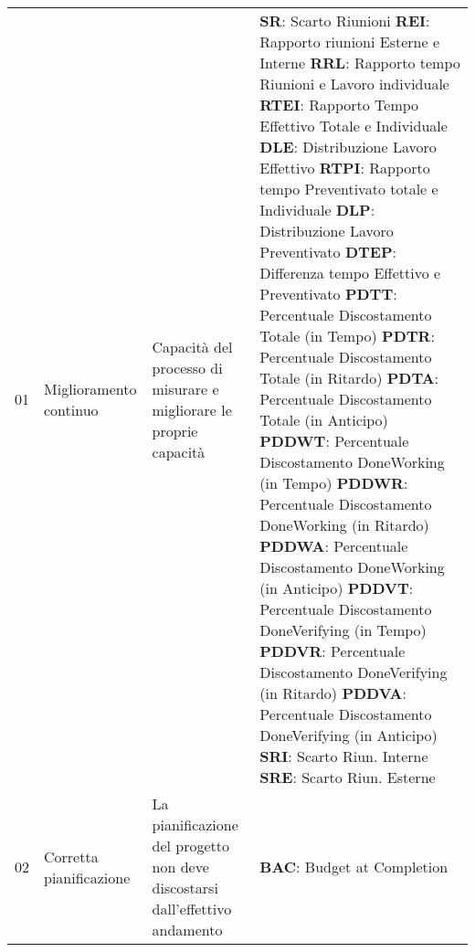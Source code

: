 \begin{longtable}{ 
		>{}p{} 
		>{}p{}
        >{}p{}
        >{\centering}p{} }
        01 & Miglioramento continuo & Capacità del processo di misurare e migliorare le proprie capacità & \textbf{SR}: Scarto Riunioni \newline
                         \textbf{REI}: Rapporto riunioni Esterne e Interne \newline
                        \textbf{RRL}: Rapporto tempo Riunioni e Lavoro individuale \newline
                        \textbf{RTEI}: Rapporto Tempo Effettivo Totale e Individuale \newline
                        \textbf{DLE}: Distribuzione Lavoro Effettivo \newline
                        \textbf{RTPI}: Rapporto tempo Preventivato totale e Individuale \newline
                         \textbf{DLP}: Distribuzione Lavoro Preventivato \newline 
                         \textbf{DTEP}: Differenza tempo Effettivo e Preventivato \newline 
                         \textbf{PDTT}: Percentuale Discostamento Totale (in Tempo) \newline 
                         \textbf{PDTR}: Percentuale Discostamento Totale (in Ritardo) \newline 
                         \textbf{PDTA}: Percentuale Discostamento Totale (in Anticipo) \newline 
                         \textbf{PDDWT}: Percentuale Discostamento DoneWorking (in Tempo) \newline 
                         \textbf{PDDWR}: Percentuale Discostamento DoneWorking (in Ritardo) \newline 
                         \textbf{PDDWA}: Percentuale Discostamento DoneWorking (in Anticipo) \newline 
                         \textbf{PDDVT}: Percentuale Discostamento DoneVerifying (in Tempo) \newline
                         \textbf{PDDVR}: Percentuale Discostamento DoneVerifying (in Ritardo) \newline
                         \textbf{PDDVA}: Percentuale Discostamento DoneVerifying (in Anticipo) \newline
                         \textbf{SRI}: Scarto Riun. Interne \newline 
                         \textbf{SRE}: Scarto Riun. Esterne 
                         \tabularnewline
        02 & Corretta pianificazione & La pianificazione del progetto non deve discostarsi dall'effettivo andamento &\textbf{ BAC}: Budget at Completion \newline 

\end{longtable}

